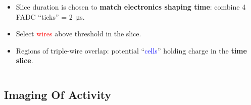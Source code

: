 \begin{frame}[fragile]
\begin{columns}
\begin{column}{0.65\textwidth}
      \begin{itemize} \scriptsize
      \item Slice duration is chosen to \textbf{match
          electronics shaping time}: combine 4 FADC ``ticks'' =
        \SI{2}{\micro\second}.
      \item Select \textcolor{red}{wires} above threshold in the slice.
      \item Regions of triple-wire overlap: potential ``\textcolor{blue}{cells}'' holding charge in the \textbf{time slice}.
      \end{itemize}
    \end{column}
  \end{columns}

\end{frame}

\subsection{Imaging Of Activity}

